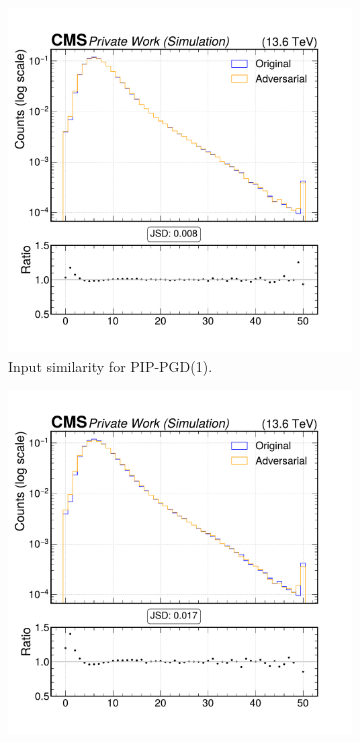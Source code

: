 \begin{figure}[h]
  \centering
  \begin{subfigure}[t]{0.32\textwidth}
    \includegraphics[width=\linewidth]{media/output/features/compare/combined_it_1/cmp_global_features_n_Cpfcand.pdf}
    \caption*{Input similarity for PIP-PGD(1).}
  \end{subfigure}\hfill
  \begin{subfigure}[t]{0.32\textwidth}
    \includegraphics[width=\linewidth]{media/output/features/compare/combined_it_2/cmp_global_features_n_Cpfcand.pdf}

\end{subfigure}
\end{figure}
